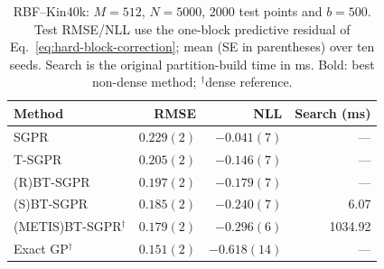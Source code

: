\begin{table}[!ht]
\caption{RBF--Kin40k: \(M=512\), \(N=5000\), 2000 test points and \(b=500\). Test RMSE/NLL use the one-block predictive residual of Eq.~\eqref{eq:hard-block-correction}; mean (SE in parentheses) over ten seeds. Search is the original partition-build time in ms. Bold: best non-dense method; \(^\dagger\)dense reference.}
\label{tab:kin40k-sgpr}
\centering\footnotesize
\setlength{\tabcolsep}{3pt}
\begin{tabular}{@{}lrrr@{}}
\toprule
Method & RMSE & NLL & Search (ms) \\
\midrule
SGPR & $0.229(2)$ & $-0.041(7)$ & --- \\
T-SGPR & $0.205(2)$ & $-0.146(7)$ & --- \\
(R)BT-SGPR & $0.197(2)$ & $-0.179(7)$ & --- \\
(S)BT-SGPR & \textbf{$0.185(2)$} & \textbf{$-0.240(7)$} & 6.07 \\
\midrule
(METIS)BT-SGPR$^\dagger$ & $0.179(2)$ & $-0.296(6)$ & 1034.92 \\
Exact GP$^\dagger$ & $0.151(2)$ & $-0.618(14)$ & --- \\
\bottomrule
\end{tabular}
\end{table}
